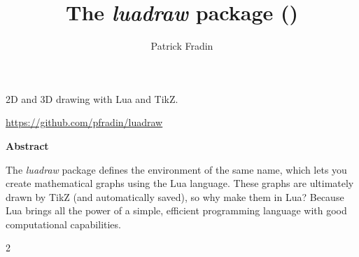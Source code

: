 \documentclass[%
10pt,%
oneside,
a4paper,%
notitlepage
]%
{book}%
\title{\textbf{The \emph{luadraw} package (\version)}}
\author{Patrick Fradin}
\newcommand*{\luadrawenv}{\emph{luadraw}\xspace}%
\begin{document}
\maketitle

\hfil{\Large 2D and 3D drawing with Lua and TikZ.}\hfil\par

\hfil{\small \url{https://github.com/pfradin/luadraw}}\hfil\par

\vspace*{2cm}


\begin{small}
\hfil\textbf{Abstract}\hfil\par
The \luadrawenv package defines the environment of the same name, which lets you create mathematical graphs using the Lua language. These graphs are ultimately drawn by TikZ (and automatically saved), so why make them in Lua? Because Lua brings all the power of a simple, efficient programming language with good computational capabilities.
\end{small}


\clearpage%
\setcounter{tocdepth}{3}%
\setcounter{secnumdepth}{2}%

\begin{multicols}{2}
\tableofcontents
\end{multicols}

\listoffigures

\renewcommand{\labelitemi}{$\bullet$}
\renewcommand{\labelitemii}{--}
\renewcommand{\labelitemiii}{$*$}
\renewcommand{\thesection}{\Roman{section}~}
\renewcommand{\thesubsection}{\arabic{subsection})}
\renewcommand{\thesubsubsection}{\arabic{subsection}.\arabic{subsubsection}}
\renewcommand{\thefigure}{\arabic{figure}}





\end{document}
